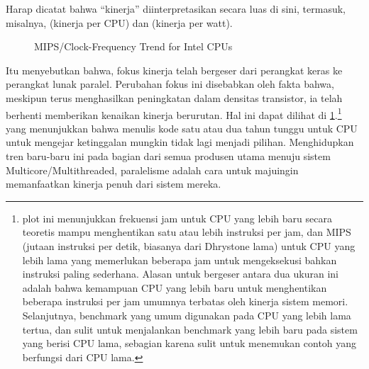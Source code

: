 \QuickQuizEnd

Harap dicatat bahwa ``kinerja'' diinterpretasikan secara luas di sini,
termasuk, misalnya,  (kinerja per CPU) dan 
(kinerja per watt).

\begin{figure}
\centering
{}
\caption{MIPS/Clock-Frequency Trend for Intel CPUs}
\label{fig:intro:Clock-Frequency Trend for Intel CPUs}
\end{figure}

Itu menyebutkan bahwa, fokus kinerja telah bergeser dari perangkat keras ke
perangkat lunak paralel.
Perubahan fokus ini disebabkan oleh fakta bahwa, meskipun 
terus menghasilkan peningkatan dalam densitas transistor, ia telah berhenti
memberikan kenaikan kinerja berurutan.
Hal ini dapat dilihat di
\cref{fig:intro:Clock-Frequency Trend for Intel CPUs}.\footnote{
	plot ini menunjukkan frekuensi jam untuk CPU yang lebih baru secara
	teoretis mampu menghentikan satu atau lebih instruksi per jam, dan MIPS
	(jutaan instruksi per detik, biasanya dari Dhrystone lama)
	untuk CPU yang lebih lama yang memerlukan beberapa jam untuk mengeksekusi
	bahkan instruksi paling sederhana.
	Alasan untuk bergeser antara dua ukuran ini adalah bahwa kemampuan
	CPU yang lebih baru untuk menghentikan beberapa instruksi per jam
	umumnya terbatas oleh kinerja sistem memori.
	Selanjutnya, benchmark yang umum digunakan pada CPU yang lebih lama
	tertua, dan sulit untuk menjalankan benchmark yang lebih baru
	pada sistem yang berisi CPU lama, sebagian karena
	sulit untuk menemukan contoh yang berfungsi dari CPU lama.
}
yang menunjukkan bahwa menulis kode satu atau dua tahun tunggu untuk CPU untuk mengejar ketinggalan mungkin tidak lagi menjadi pilihan. Menghidupkan tren baru-baru ini pada bagian dari semua produsen utama menuju sistem Multicore/Multithreaded, paralelisme adalah cara untuk majuingin memanfaatkan kinerja penuh dari sistem mereka.

